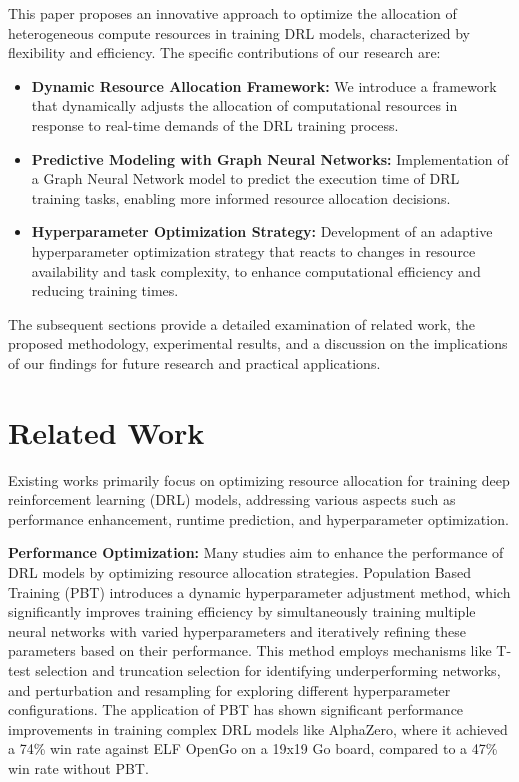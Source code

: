\documentclass[10pt,journal,compsoc]{IEEEtran}
\begin{document}
	This paper proposes an innovative approach to optimize the allocation of heterogeneous compute resources in training DRL models, characterized by flexibility and efficiency. The specific contributions of our research are:

	\begin{itemize}
		\item \textbf{Dynamic Resource Allocation Framework:} We introduce a framework that dynamically adjusts the allocation of computational resources in response to real-time demands of the DRL training process.
		\item \textbf{Predictive Modeling with Graph Neural Networks:} Implementation of a Graph Neural Network model to predict the execution time of DRL training tasks, enabling more informed resource allocation decisions.
		\item \textbf{Hyperparameter Optimization Strategy:} Development of an adaptive hyperparameter optimization strategy that reacts to changes in resource availability and task complexity, to enhance computational efficiency and reducing training times.
	\end{itemize}


	
	The subsequent sections provide a detailed examination of related work, the proposed methodology, experimental results, and a discussion on the implications of our findings for future research and practical applications.
	



\section{Related Work}\label{related}

Existing works primarily focus on optimizing resource allocation for training deep reinforcement learning (DRL) models, addressing various aspects such as performance enhancement, runtime prediction, and hyperparameter optimization. 

\noindent\textbf{Performance Optimization:} Many studies aim to enhance the performance of DRL models by optimizing resource allocation strategies.
%
Population Based Training (PBT) \cite{pbt} introduces a dynamic hyperparameter adjustment method, which significantly improves training efficiency by simultaneously training multiple neural networks with varied hyperparameters and iteratively refining these parameters based on their performance.
%
This method employs mechanisms like T-test selection and truncation selection for identifying underperforming networks, and perturbation and resampling for exploring different hyperparameter configurations.
%
The application of PBT has shown significant performance improvements in training complex DRL models like AlphaZero, where it achieved a 74\% win rate against ELF OpenGo on a 19x19 Go board, compared to a 47\% win rate without PBT.
\end{document}
